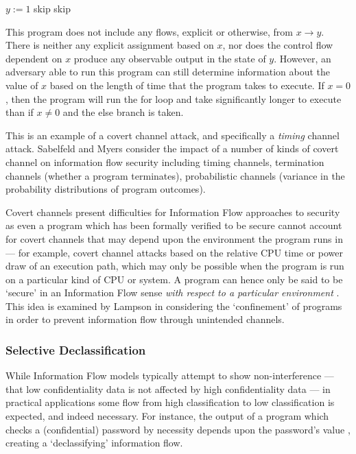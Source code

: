 \begin{algorithmic}
	\State $ y := 1 $
			\State skip
		\EndFor
	\Else
		\State skip
	\EndIf
\end{algorithmic}

This program does not include any flows, explicit or otherwise, from $ x \rightarrow y $. There is neither any explicit assignment based on $ x $, nor does the control flow dependent on $ x $ produce any observable output in the state of $ y $. However, an adversary able to run this program can still determine information about the value of $ x $ based on the length of time that the program takes to execute. If $ x = 0 $, then the program will run the for loop and take significantly longer to execute than if $ x \ne 0 $ and the else branch is taken.

This is an example of a covert channel attack, and specifically a \textit{timing} channel attack. Sabelfeld and Myers \cite{sabelfeld2003if} consider the impact of a number of kinds of covert channel on information flow security including timing channels, termination channels (whether a program terminates), probabilistic channels (variance in the probability distributions of program outcomes).

Covert channels present difficulties for Information Flow approaches to security as even a program which has been formally verified to be secure cannot account for covert channels that may depend upon the environment the program runs in --- for example, covert channel attacks based on the relative CPU time or power draw of an execution path, which may only be possible when the program is run on a particular kind of CPU or system. A program can hence only be said to be `secure' in an Information Flow sense \textit{with respect to a particular environment} \cite{sabelfeld2003if}. This idea is examined by Lampson \cite{lampson1973covertchannels} in considering the `confinement' of programs in order to prevent information flow through unintended channels.	

\subsubsection{Selective Declassification}

While Information Flow models typically attempt to show non-interference --- that low confidentiality data is not affected by high confidentiality data --- in practical applications some flow from high classification to low classification is expected, and indeed necessary. For instance, the output of a program which checks a (confidential) password by necessity depends upon the password's value \cite{sabelfeld2003if}, creating a `declassifying' information flow.

